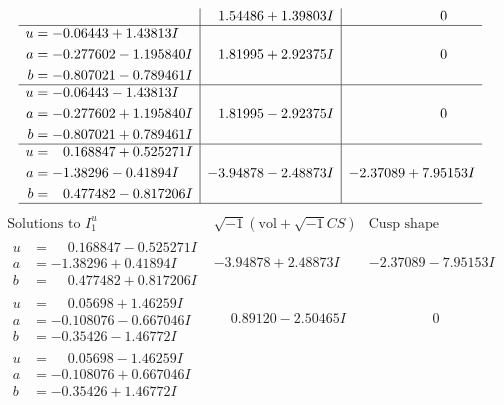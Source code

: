 \documentclass[1p]{elsarticle_modified}
\theoremstyle{definition}
\newcommand{\I}{\sqrt{-1}}
\begin{document}
$$\begin{array}{c|c|c}
 & \phantom{-}1.54486 + 1.39803 I & \phantom{-0.000000 } 0 \\ \hline\begin{aligned}
u &= -0.06443 + 1.43813 I \\
a &= -0.277602 - 1.195840 I \\
b &= -0.807021 - 0.789461 I\end{aligned}
 & \phantom{-}1.81995 + 2.92375 I & \phantom{-0.000000 } 0 \\ \hline\begin{aligned}
u &= -0.06443 - 1.43813 I \\
a &= -0.277602 + 1.195840 I \\
b &= -0.807021 + 0.789461 I\end{aligned}
 & \phantom{-}1.81995 - 2.92375 I & \phantom{-0.000000 } 0 \\ \hline\begin{aligned}
u &= \phantom{-}0.168847 + 0.525271 I \\
a &= -1.38296 - 0.41894 I \\
b &= \phantom{-}0.477482 - 0.817206 I\end{aligned}
 & -3.94878 - 2.48873 I & -2.37089 + 7.95153 I\\
 \hline 
 \end{array}$$\newpage$$\begin{array}{c|c|c}  
\text{Solutions to }I^u_{1}& \I (\text{vol} + \sqrt{-1}CS) & \text{Cusp shape}\\
 \hline 
\begin{aligned}
u &= \phantom{-}0.168847 - 0.525271 I \\
a &= -1.38296 + 0.41894 I \\
b &= \phantom{-}0.477482 + 0.817206 I\end{aligned}
 & -3.94878 + 2.48873 I & -2.37089 - 7.95153 I \\ \hline\begin{aligned}
u &= \phantom{-}0.05698 + 1.46259 I \\
a &= -0.108076 - 0.667046 I \\
b &= -0.35426 - 1.46772 I\end{aligned}
 & \phantom{-}0.89120 - 2.50465 I & \phantom{-0.000000 } 0 \\ \hline\begin{aligned}
u &= \phantom{-}0.05698 - 1.46259 I \\
a &= -0.108076 + 0.667046 I \\
b &= -0.35426 + 1.46772 I\end{aligned}

\end{array}$$
\end{document}

